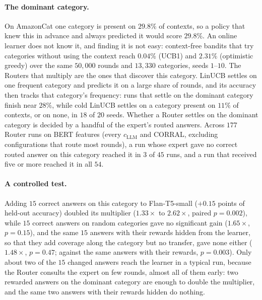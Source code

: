 \documentclass[anon]{alt2027} %
\begin{document}
\paragraph{The dominant category.} On AmazonCat one category is present on
$29.8\%$ of contexts, so a policy that knew this in advance and always
predicted it would score $29.8\%$. An online learner does not know it, and
finding it is not easy: context-free bandits that try categories without
using the context reach $0.04\%$ (UCB1) and $2.31\%$ (optimistic greedy) over
the same $50{,}000$ rounds and $13{,}330$ categories, seeds $1$--$10$. The
Routers that multiply are the ones that discover this category. LinUCB
settles on one frequent category and predicts it on a large share of rounds,
and its accuracy then tracks that category's frequency: runs that settle on
the dominant category finish near $28\%$, while cold LinUCB settles on a
category present on $11\%$ of contexts, or on none, in $18$ of $20$ seeds.
Whether a Router settles on the dominant category is decided by a handful of
the expert's routed answers. Across $177$ Router runs on BERT features (every
$c_{\mathrm{LLM}}$ and CORRAL, excluding configurations that route most rounds), a run whose
expert gave no correct routed answer on this category reached it in $3$ of
$45$ runs, and a run that received five or more reached it in all $54$.

\paragraph{A controlled test.} Adding $15$ correct answers on this category
to Flan-T5-small ($+0.15$ points of held-out accuracy) doubled its multiplier
($1.33\times$ to $2.62\times$, paired $p=0.002$), while $15$ correct answers on
random categories gave no significant gain ($1.65\times$, $p=0.15$), and the
same $15$ answers with their rewards hidden from the learner, so that they add
coverage along the category but no transfer, gave none either ($1.48\times$,
$p=0.47$; against the same answers with their rewards, $p=0.003$). Only about
two of the $15$ changed answers reach the learner in a typical run, because
the Router consults the expert on few rounds, almost all of them early: two
rewarded answers on the dominant category are enough to double the
multiplier, and the same two answers with their rewards hidden do nothing.
\end{document}
